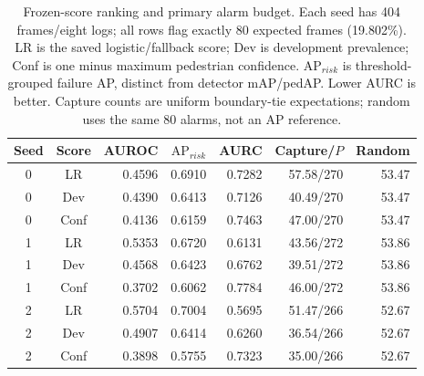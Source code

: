 \begin{table}[t]
\caption{Frozen-score ranking and primary alarm budget. Each seed has 404 frames/eight logs; all rows flag exactly 80 expected frames (19.802\%). LR is the saved logistic/fallback score; Dev is development prevalence; Conf is one minus maximum pedestrian confidence. $\mathrm{AP}_{risk}$ is threshold-grouped failure AP, distinct from detector mAP/pedAP. Lower AURC is better. Capture counts are uniform boundary-tie expectations; random uses the same 80 alarms, not an AP reference.}
\label{tab:ranking}
\centering\footnotesize
\setlength{\tabcolsep}{2.6pt}
\begin{tabular}{ccrrrrr}\toprule
Seed & Score & AUROC & $\mathrm{AP}_{risk}$ & AURC & Capture/$P$ & Random\\\midrule
0 & LR & 0.4596 & 0.6910 & 0.7282 & 57.58/270 & 53.47 \\
0 & Dev & 0.4390 & 0.6413 & 0.7126 & 40.49/270 & 53.47 \\
0 & Conf & 0.4136 & 0.6159 & 0.7463 & 47.00/270 & 53.47 \\
1 & LR & 0.5353 & 0.6720 & 0.6131 & 43.56/272 & 53.86 \\
1 & Dev & 0.4568 & 0.6423 & 0.6762 & 39.51/272 & 53.86 \\
1 & Conf & 0.3702 & 0.6062 & 0.7784 & 46.00/272 & 53.86 \\
2 & LR & 0.5704 & 0.7004 & 0.5695 & 51.47/266 & 52.67 \\
2 & Dev & 0.4907 & 0.6414 & 0.6260 & 36.54/266 & 52.67 \\
2 & Conf & 0.3898 & 0.5755 & 0.7323 & 35.00/266 & 52.67 \\
\bottomrule\end{tabular}
\end{table}
